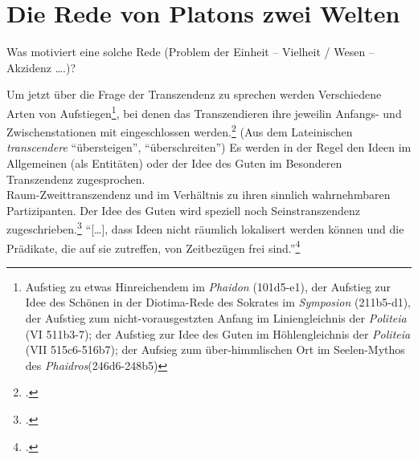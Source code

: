 
\section{Die Rede von Platons zwei Welten}
Was motiviert eine solche Rede (Problem der Einheit – Vielheit / Wesen – Akzidenz ….)?


Um jetzt über die Frage der Transzendenz zu sprechen werden 
Verschiedene Arten von Aufstiegen\footnote{Aufstieg zu etwas Hinreichendem im \emph{Phaidon} (101d5-e1), der Aufstieg zur Idee des Schönen in der Diotima-Rede des Sokrates im \emph{Symposion} (211b5-d1), der Aufstieg zum nicht-vorausgestzten Anfang im Liniengleichnis der \emph{Politeia} (VI 511b3-7); der Aufstieg zur Idee des Guten im Höhlengleichnis der \emph{Politeia} (VII 515c6-516b7); der Aufsieg zum über-himmlischen Ort im Seelen-Mythos des \emph{Phaidros}(246d6-248b5)}, bei denen das Transzendieren ihre jeweilin Anfangs- und Zwischenstationen mit eingeschlossen werden.\footcite[vgl.][S. 347]{StrobelTranszendenz} (Aus dem Lateinischen \emph{transcendere} \enquote{übersteigen}, \enquote{überschreiten}) 
Es werden in der Regel den Ideen im Allgemeinen (als Entitäten) oder der Idee des Guten im Besonderen Transzendenz zugesprochen.\\
Raum-Zweittranszendenz und im Verhältnis zu ihren sinnlich wahrnehmbaren Partizipanten. Der Idee des Guten wird speziell noch Seinstranszendenz zugeschrieben.\footcite[vgl.][S. 347]{StrobelTranszendenz}
\enquote{[\dots], dass Ideen nicht räumlich lokalisert werden können und die Prädikate, die auf sie zutreffen, von Zeitbezügen frei sind.}\footcite[vgl.][S. 347]{StrobelTranszendenz}
